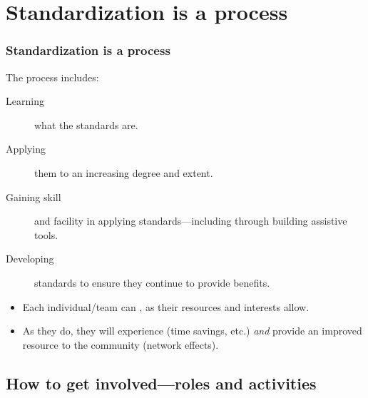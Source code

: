 \documentclass[12pt,aspectratio=169]{beamer}
\begin{document}
\begin{frame}
\end{frame}

\section{Standardization is a process}

\begin{frame}
\frametitle{Standardization is a process}

The process includes:
\begin{description}
  \item [Learning] what the standards are.
  \item [Applying] them to an increasing degree and extent.
  \item [Gaining skill] and facility in applying standards—including through building assistive tools.
  \item [Developing] standards to ensure they continue to provide benefits.
\end{description}

\bigskip
\begin{itemize}
  \item Each individual/team can , as their resources and interests allow.
  \item As they do, they will experience  (time savings, etc.) \emph{and} provide an improved resource to the community (network effects).
\end{itemize}

\end{frame}

\subsection{How to get involved—roles and activities}
\end{document}
